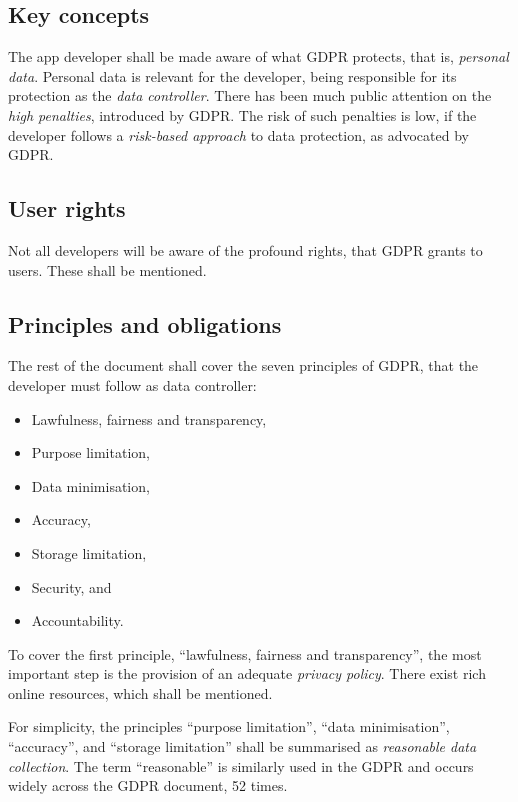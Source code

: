 \documentclass[
]{book}
\providecommand{\tightlist}{%
  \setlength{\itemsep}{0pt}\setlength{\parskip}{0pt}}
\begin{document}
\hypertarget{key-concepts}{%
\subsection{Key concepts}\label{key-concepts}}

The app developer shall be made aware of what GDPR protects, that is, \emph{personal data}. Personal data is relevant for the developer, being responsible for its protection as the \emph{data controller}. There has been much public attention on the \emph{high penalties}, introduced by GDPR. The risk of such penalties is low, if the developer follows a \emph{risk-based approach} to data protection, as advocated by GDPR.

\hypertarget{user-rights}{%
\subsection{User rights}\label{user-rights}}

Not all developers will be aware of the profound rights, that GDPR grants to users. These shall be mentioned.

\hypertarget{principles-and-obligations}{%
\subsection{Principles and obligations}\label{principles-and-obligations}}

The rest of the document shall cover the seven principles of GDPR, that the developer must follow as data controller:

\begin{itemize}
\tightlist
\item
  Lawfulness, fairness and transparency,
\item
  Purpose limitation,
\item
  Data minimisation,
\item
  Accuracy,
\item
  Storage limitation,
\item
  Security, and
\item
  Accountability.
\end{itemize}

To cover the first principle, ``lawfulness, fairness and transparency'', the most important step is the provision of an adequate \emph{privacy policy}. There exist rich online resources, which shall be mentioned.

For simplicity, the principles ``purpose limitation'', ``data minimisation'', ``accuracy'', and ``storage limitation'' shall be summarised as \emph{reasonable data collection}. The term ``reasonable'' is similarly used in the GDPR and occurs widely across the GDPR document, 52 times.
\end{document}
